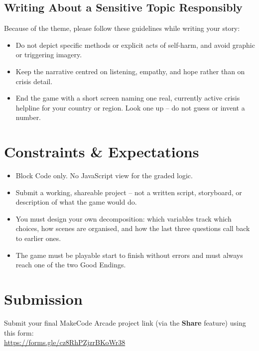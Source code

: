 \documentclass[11pt]{article}
\begin{document}
\subsection{Writing About a Sensitive Topic Responsibly}
Because of the theme, please follow these guidelines while writing your story:
\begin{itemize}
\item Do not depict specific methods or explicit acts of self-harm, and avoid graphic
or triggering imagery.
\item Keep the narrative centred on listening, empathy, and hope rather than on
crisis detail.
\item End the game with a short screen naming one real, currently active crisis
helpline for your country or region. Look one up -- do not guess or invent a number.
\end{itemize}

\section{Constraints \& Expectations}
\begin{itemize}
\item Block Code only. No JavaScript view for the graded logic.
\item Submit a working, shareable project -- not a written script, storyboard, or
description of what the game would do.
\item You must design your own decomposition: which variables track which choices,
how scenes are organised, and how the last three questions call back to earlier ones.
\item The game must be playable start to finish without errors and must always reach
one of the two Good Endings.
\end{itemize}

\section{Submission}
Submit your final MakeCode Arcade project link (via the \textbf{Share} feature) using
this form:\\[4pt]
\url{https://forms.gle/cz8RhPZjzrBKoWr38}
\end{document}
